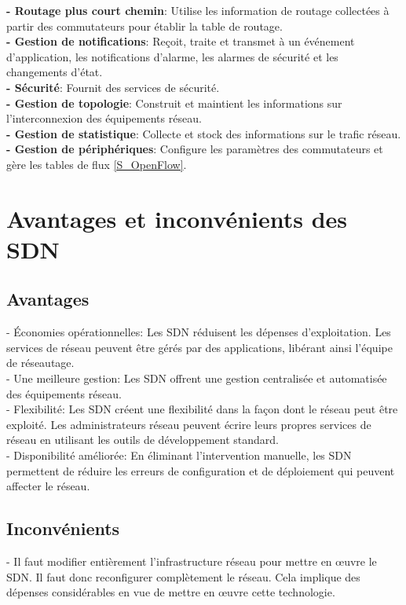 \noindent\textbf{- Routage plus court chemin}: Utilise les information de routage collectées à partir des commutateurs pour établir la table de routage.\\
\textbf{- Gestion de notifications}: Reçoit, traite et transmet à un événement d’application, les notifications d’alarme, les alarmes de sécurité et les changements d’état.\\
\textbf{- Sécurité}: Fournit des services de sécurité.\\
\textbf{- Gestion de topologie}: Construit et maintient les informations sur l'interconnexion des équipements réseau.\\
\textbf{- Gestion de statistique}: Collecte et stock des informations sur le trafic réseau.\\
\textbf{- Gestion de périphériques}: Configure les paramètres des commutateurs et gère les tables de flux \autoref{S_OpenFlow}.
 

\section{Avantages et inconvénients des SDN}
\subsection{Avantages}
\noindent - Économies opérationnelles: Les SDN réduisent les dépenses d’exploitation. Les services de réseau peuvent être gérés par des applications, libérant ainsi l’équipe de réseautage.\\

\noindent - Une meilleure gestion: Les SDN offrent une gestion centralisée et automatisée des équipements réseau.\\

\noindent - Flexibilité: Les SDN créent une flexibilité dans la façon dont le réseau peut être exploité. Les administrateurs réseau peuvent écrire leurs propres services de réseau en utilisant les outils de développement standard.\\

\noindent - Disponibilité améliorée: En éliminant l’intervention manuelle, les SDN permettent de réduire les erreurs de configuration et de déploiement qui peuvent affecter le réseau. 

\subsection{Inconvénients}
\noindent - Il faut modifier entièrement l’infrastructure réseau  pour mettre en œuvre le SDN. Il faut donc reconfigurer complètement le réseau. Cela implique des dépenses considérables en vue de mettre en œuvre cette technologie.\\

